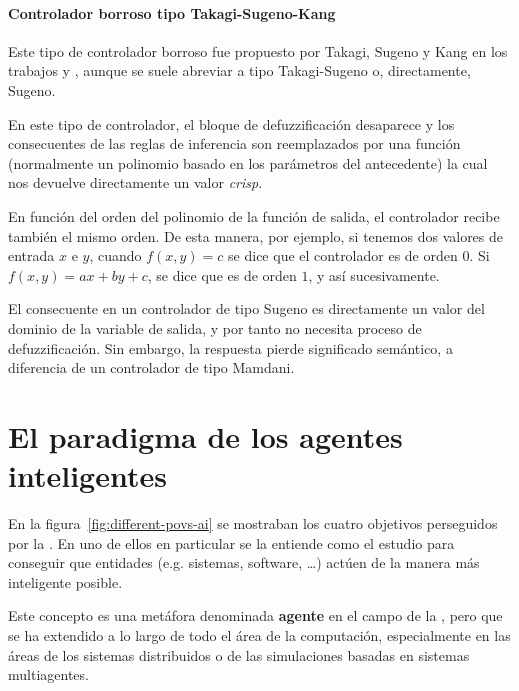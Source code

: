 \paragraph{Controlador borroso tipo Takagi-Sugeno-Kang}

Este tipo de controlador borroso fue propuesto por Takagi, Sugeno y Kang en los trabajos \cite{takagi1993fuzzy} y \cite{sugeno1988structure}, aunque se suele abreviar a tipo Takagi-Sugeno o, directamente, Sugeno.

En este tipo de controlador, el bloque de defuzzificación desaparece y los consecuentes de las reglas de inferencia son reemplazados por una función (normalmente un polinomio basado en los parámetros del antecedente) la cual nos devuelve directamente un valor \textit{crisp}.

En función del orden del polinomio de la función de salida, el controlador recibe también el mismo orden. De esta manera, por ejemplo, si tenemos dos valores de entrada $x$ e $y$, cuando $f(x, y) = c$ se dice que el controlador es de orden $0$. Si $f(x, y) = ax + by + c$, se dice que es de orden $1$, y así sucesivamente.

El consecuente en un controlador de tipo Sugeno es directamente un valor del dominio de la variable de salida, y por tanto no necesita proceso de defuzzificación. Sin embargo, la respuesta pierde significado semántico, a diferencia de un controlador de tipo Mamdani.

\section{El paradigma de los agentes inteligentes}
\label{ch:ci:s:agent-concept}

En la figura~\ref{fig:different-povs-ai} se mostraban los cuatro objetivos perseguidos por la . En uno de ellos en particular se la entiende como el estudio para conseguir que entidades (e.g. sistemas, software, \ldots) actúen de la manera más inteligente posible.

Este concepto es una metáfora denominada \textbf{agente} en el campo de la , pero que se ha extendido a lo largo de todo el área de la computación, especialmente en las áreas de los sistemas distribuidos o de las simulaciones basadas en sistemas multiagentes.

